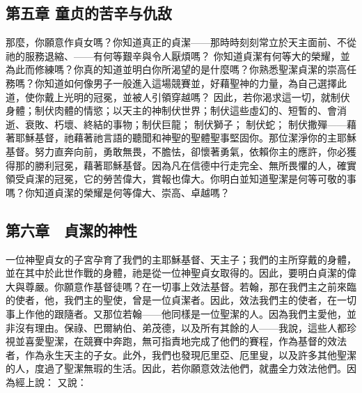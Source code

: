 
\subsection{第五章 童贞的苦辛与仇敌}

那麼，你願意作貞女嗎？你知道真正的貞潔——那時時刻刻常立於天主面前、不從祂的服務退縮、——有何等艱辛與令人厭煩嗎？ 你知道貞潔有何等大的榮耀，並為此而修練嗎？你真的知道並明白你所渴望的是什麼嗎？你熟悉聖潔貞潔的崇高任務嗎？你知道如何像男子一般進入這場競賽並，好藉聖神的力量，為自己選擇此道，使你戴上光明的冠冕，並被人引領穿越嗎？ 因此，若你渴求這一切，就制伏身體；制伏肉體的情慾；以天主的神制伏世界；制伏這些虛幻的、短暫的、會消逝、衰敗、朽壞、終結的事物；制伏巨龍； 制伏獅子； 制伏蛇； 制伏撒殫——藉著耶穌基督，祂藉著祂言語的聽聞和神聖的聖體聖事堅固你。那位潔淨你的主耶穌基督。努力直奔向前，勇敢無畏，不膽怯，卻懷著勇氣，依賴你主的應許，你必獲得那的勝利冠冕，藉著耶穌基督。因為凡在信德中行走完全、無所畏懼的人，確實領受貞潔的冠冕，它的勞苦偉大，賞報也偉大。你明白並知道聖潔是何等可敬的事嗎？你知道貞潔的榮耀是何等偉大、崇高、卓越嗎？\par


\subsection{第六章　貞潔的神性}

一位神聖貞女的子宮孕育了我們的主耶穌基督、天主子；我們的主所穿戴的身體，並在其中於此世作戰的身體，祂是從一位神聖貞女取得的。因此，要明白貞潔的偉大與尊嚴。你願意作基督徒嗎？在一切事上效法基督。若翰，那在我們主之前來臨的使者，他，我們主的聖使，曾是一位貞潔者。因此，效法我們主的使者，在一切事上作他的跟隨者。又那位若翰——他同樣是一位聖潔的人。因為我們主愛他，並非沒有理由。保祿、巴爾納伯、弟茂德，以及所有其餘的人——我說，這些人都珍視並喜愛聖潔，在競賽中奔跑，無可指責地完成了他們的賽程，作為基督的效法者，作為永生天主的子女。此外，我們也發現厄里亞、厄里叟，以及許多其他聖潔的人，度過了聖潔無瑕的生活。因此，若你願意效法他們，就盡全力效法他們。因為經上說： 又說：\par

